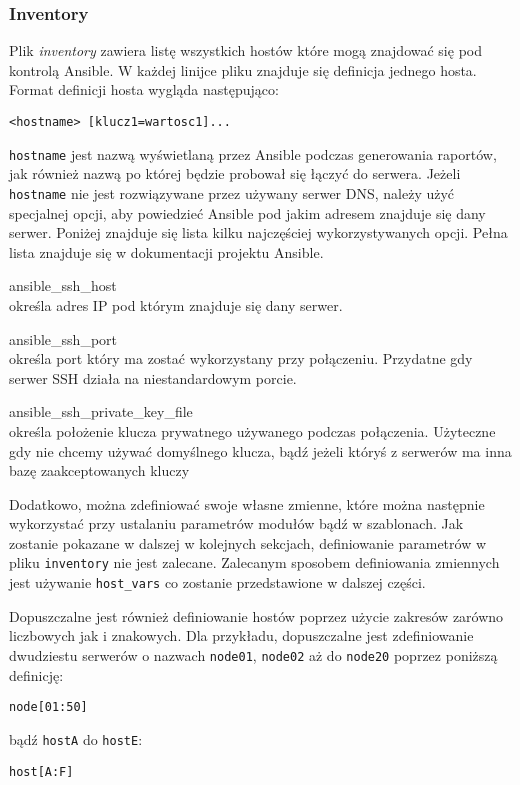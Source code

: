 \subsubsection{Inventory}
\label{sec:zarzadzanie_ansible_inventory}
Plik \textit{inventory} zawiera listę wszystkich hostów które mogą znajdować się pod kontrolą Ansible.  
W każdej linijce pliku znajduje się definicja jednego hosta.
Format definicji hosta wygląda następująco:
\begin{lstlisting}
<hostname> [klucz1=wartosc1]...
\end{lstlisting}
\texttt{hostname} jest nazwą wyświetlaną przez Ansible podczas generowania raportów, jak również nazwą po której będzie probował się łączyć do serwera.
Jeżeli \texttt{hostname} nie jest rozwiązywane przez używany serwer DNS, należy użyć specjalnej opcji, aby powiedzieć Ansible pod jakim adresem znajduje się dany serwer.
Poniżej znajduje się lista kilku najczęściej wykorzystywanych opcji. Pełna lista znajduje się w dokumentacji projektu Ansible.
\begin{description}
\item{ansible\_ssh\_host}\\
	określa adres IP pod którym znajduje się dany serwer.	
\item{ansible\_ssh\_port}\\
	określa port który ma zostać wykorzystany przy połączeniu. Przydatne gdy serwer SSH działa na niestandardowym porcie.
\item{ansible\_ssh\_private\_key\_file}\\
	określa położenie klucza prywatnego używanego podczas połączenia. Użyteczne gdy nie chcemy używać domyślnego klucza, bądź jeżeli któryś z serwerów ma inna bazę zaakceptowanych kluczy
\end{description}
Dodatkowo, można zdefiniować swoje własne zmienne, które można następnie wykorzystać przy ustalaniu parametrów modułów bądź w szablonach.  
Jak zostanie pokazane w dalszej w kolejnych sekcjach, definiowanie parametrów w pliku \texttt{inventory} nie jest zalecane.
Zalecanym sposobem definiowania zmiennych jest używanie \texttt{host\_vars} co zostanie przedstawione w dalszej części.

Dopuszczalne jest również definiowanie hostów poprzez użycie zakresów zarówno liczbowych jak i znakowych.
Dla przykładu, dopuszczalne jest zdefiniowanie dwudziestu serwerów o nazwach \texttt{node01}, \texttt{node02} aż do \texttt{node20} poprzez poniższą definicję:
\begin{lstlisting}
node[01:50]
\end{lstlisting}
bądź \texttt{hostA} do \texttt{hostE}:
\begin{lstlisting}
host[A:F]
\end{lstlisting}

